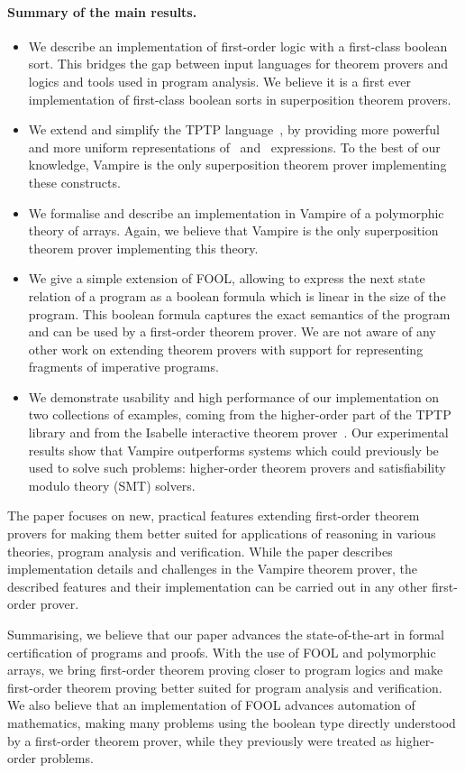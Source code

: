 \noindent\paragraph{Summary of the main results.}
\begin{itemize}
\item We describe an implementation of first-order logic with a first-class boolean sort. This bridges the gap between input languages for theorem provers and logics and tools used in program analysis. We believe it is a first ever implementation of first-class boolean sorts in superposition theorem provers.

\item We extend and simplify the TPTP language~\cite{TPTP}, by providing more powerful and more uniform representations of \ITE\ and \LETIN\ expressions. To the best of our knowledge, Vampire is the only superposition theorem prover implementing these constructs.

\item We formalise and describe an implementation in Vampire of a polymorphic theory of arrays. Again, we believe that Vampire is the only superposition theorem prover implementing this theory.

\item We give a simple extension of FOOL, allowing to express the next state relation of a program as a boolean formula which is linear in the size of the program. This  boolean formula captures the exact semantics of the program and can be used by a first-order theorem prover. We are not aware of any other work on extending theorem provers with support for representing fragments of imperative programs.

\item We demonstrate usability and high performance of our implementation on two collections of examples, coming from the higher-order part of the TPTP library and from the Isabelle interactive theorem prover~\cite{Isabelle}. Our experimental results show that Vampire outperforms systems which could previously be used to solve such problems:
higher-order theorem provers and satisfiability modulo theory (SMT) solvers.
\end{itemize}

The paper focuses on new, practical features extending first-order theorem provers for making them better suited for applications of reasoning in various theories, program analysis and verification. While the paper describes implementation details and challenges in the Vampire theorem prover, the described features and their implementation can be carried out in any other first-order prover.

Summarising, we believe that our paper advances the state-of-the-art in formal certification of programs and proofs. With the use of FOOL and polymorphic arrays, we bring first-order theorem proving closer to program logics and make first-order theorem proving better suited for program analysis and verification. We also believe that an implementation of FOOL advances automation of mathematics, making many problems using the boolean type directly understood by a first-order theorem prover, while they previously were treated as higher-order problems.
